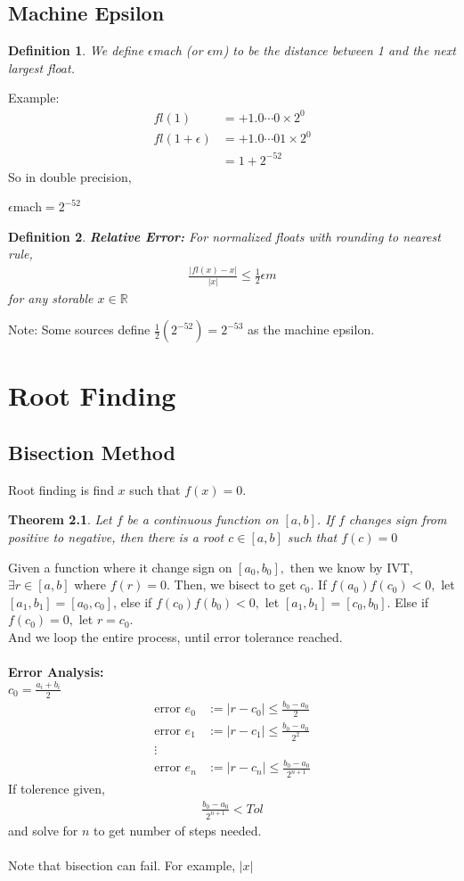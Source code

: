 \documentclass[11pt,oneside]{book}
\theoremstyle{break}
\theoremstyle{break}
\newtheorem{thm}{Theorem}[section]
\newtheorem{defn}{Definition}[corL]
\newcommand{\R}{\mathbb{R}}
\newcommand{\me}{\epsilon m}
\newcommand{\note}{\color{red}Note: \color{black}}
\newcommand{\example}{\color{purple}Example: \color{black}}
\begin{document}
\section[Machine Epsilon]{Machine Epsilon}
\begin{defn}
We define $\epsilon$mach (or $\me$) to be the distance between 1 and the next largest float.
\end{defn}
\example \begin{align*}
fl(1)&=+1.0\cdots 0 \times 2^{0}\\
fl(1+\epsilon)&=+1.0\cdots 01 \times 2^0\\
&= 1+2^{-52}
\end{align*}
So in double precision,\begin{center}
$\epsilon$mach$=2^{-52}$
\end{center}
\begin{defn}
\textbf{Relative Error:} For normalized floats with rounding to nearest rule, \begin{align*}
\frac{|fl(x)-x|}{|x|}\leq \frac{1}{2}\me
\end{align*}
for any storable $x\in \R$
\end{defn}
\note Some sources define $\frac{1}{2}(2^{-52})=2^{-53}$ as the machine epsilon.
\chapter[Root Finding]{Root Finding}
\section[Bisection Method]{Bisection Method}
Root finding is find $x$ such that $f(x)=0$.
\begin{thm}
Let $f$ be a continuous function on $[a,b]$. If $f$ changes sign from positive to negative, then there is a root $c\in [a,b]$ such that $f(c)=0$
\end{thm}
Given a function where it change sign on $[a_0,b_0],$ then we know by IVT, $\exists r\in [a,b]$ where $f(r)=0$. Then, we bisect to get $c_0.$ If $f(a_0)f(c_0)<0,$ let $[a_1,b_1]=[a_0,c_0]$, else if $f(c_0)f(b_0)<0,$ let $[a_1,b_1]=[c_0,b_0]$. Else if $f(c_0)=0,$ let $r=c_0.$\\
And we loop the entire process, until error tolerance reached. \\
\hfill\\
\textbf{Error Analysis:}\\
$c_0=\frac{a_i+b_i}{2}$\begin{align*}
\text{error }e_0&:=|r-c_0|\leq \frac{b_0-a_0}{2}\\
\text{error }e_1&:=|r-c_1|\leq \frac{b_0-a_0}{2^2}\\
\vdots&\\
\text{error }e_n&:=|r-c_n|\leq \frac{b_0-a_0}{2^{n+1}}
\end{align*}
If tolerence given, \begin{align*}
\frac{b_0-a_0}{2^{n+1}}<Tol
\end{align*}
and solve for $n$ to get number of steps needed.\\
\hfill\\
Note that bisection can fail. For example, $|x|$
\end{document}
